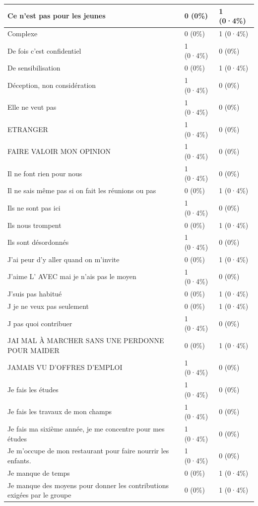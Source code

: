 \documentclass[
]{book}
\begin{document}
\begin{tabular}{l|l|l}
\hline
Ce n'est pas pour les jeunes & 0 (0\%) & 1 (0·4\%)\\
\hline
Complexe & 0 (0\%) & 1 (0·4\%)\\
\hline
De fois c'est confidentiel & 1 (0·4\%) & 0 (0\%)\\
\hline
De sensibilisation & 0 (0\%) & 1 (0·4\%)\\
\hline
Déception, non considération & 1 (0·4\%) & 0 (0\%)\\
\hline
Elle ne veut pas & 1 (0·4\%) & 0 (0\%)\\
\hline
ETRANGER & 1 (0·4\%) & 0 (0\%)\\
\hline
FAIRE VALOIR MON OPINION & 1 (0·4\%) & 0 (0\%)\\
\hline
Il ne font rien pour nous & 1 (0·4\%) & 0 (0\%)\\
\hline
Il ne sais même pas si on fait les réunions ou pas & 0 (0\%) & 1 (0·4\%)\\
\hline
Ils ne sont pas ici & 1 (0·4\%) & 0 (0\%)\\
\hline
Ils nous trompent & 0 (0\%) & 1 (0·4\%)\\
\hline
Ils sont désordonnés & 1 (0·4\%) & 0 (0\%)\\
\hline
J'ai peur d'y aller quand on m'invite & 0 (0\%) & 1 (0·4\%)\\
\hline
J'aime L' AVEC mai je n'ais pas le moyen & 1 (0·4\%) & 0 (0\%)\\
\hline
J'suis pas habitué & 0 (0\%) & 1 (0·4\%)\\
\hline
J je ne veux pas seulement & 0 (0\%) & 1 (0·4\%)\\
\hline
J pas quoi contribuer & 1 (0·4\%) & 0 (0\%)\\
\hline
JAI MAL À MARCHER SANS UNE PERDONNE POUR MAIDER & 0 (0\%) & 1 (0·4\%)\\
\hline
JAMAIS VU D'OFFRES D'EMPLOI & 1 (0·4\%) & 0 (0\%)\\
\hline
Je fais les études & 1 (0·4\%) & 0 (0\%)\\
\hline
Je fais les travaux de mon champs & 1 (0·4\%) & 0 (0\%)\\
\hline
Je fais ma sixième année, je me concentre pour mes études & 1 (0·4\%) & 0 (0\%)\\
\hline
Je m'occupe de mon restaurant pour faire nourrir les enfants. & 1 (0·4\%) & 0 (0\%)\\
\hline
Je manque de temps & 0 (0\%) & 1 (0·4\%)\\
\hline
Je manque des moyens pour donner les contributions exigées par le groupe & 0 (0\%) & 1 (0·4\%)\\

\end{tabular}
\end{document}
